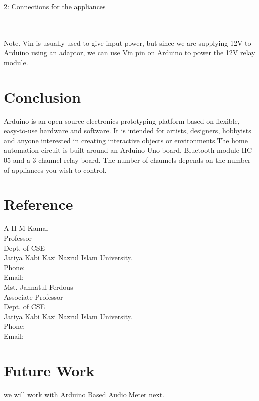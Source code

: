 \documentclass[10pt]{article}
\begin{document}
	\begin{minipage}{0.3\textwidth}	
	\figurename{2: Connections for the appliances}
\end{minipage}\\[0.3 cm]\\
Note. Vin is usually used to give input power, but since we are supplying 12V to Arduino using an adaptor, we can use Vin pin on Arduino to power the 12V relay module.
	\cleardoublepage
	\section{Conclusion}\label{sec:conclution}
	Arduino is an open source electronics prototyping platform based on flexible, easy-to-use hardware and software. It is intended for artists, designers, hobbyists and anyone interested in creating interactive objects or environments.\vspace*{0.5 cm}The home automation circuit is built around an Arduino Uno board, Bluetooth module HC-05 and a 3-channel relay board. The number of channels depends on the number of appliances you wish to control.
	\cleardoublepage
	\section{Reference}
	A H M Kamal\\ 
	Professor\\
	Dept. of CSE\\
	Jatiya Kabi Kazi Nazrul Islam University.\\ 
	Phone:\\
	Email:\\
	
	\hspace{-20pt}
	Mst. Jannatul Ferdous\\ 
	Associate Professor\\
	Dept. of CSE\\
	Jatiya Kabi Kazi Nazrul Islam University.\\ 
	Phone:\\
	Email:\\
		\cleardoublepage
			\section{Future Work}
			we will work with Arduino Based Audio Meter next.
		\cleardoublepage
\end{document}

